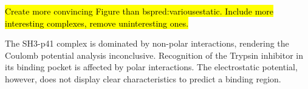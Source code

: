 \hl{Create more convincing Figure than bspred:variousestatic.
Include more interesting complexes, remove uninteresting ones.}

The SH3-p41 complex is dominated by non-polar interactions, rendering the
Coulomb potential analysis inconclusive. Recognition of the Trypsin inhibitor in
its  binding pocket is affected by polar interactions. The electrostatic
potential, however, does not display clear characteristics to predict a binding
region.


